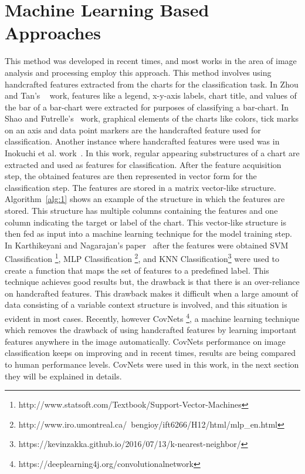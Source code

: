 \documentclass[12pt, a4paper,oneside]{report}
\begin{document}
\section{Machine Learning Based Approaches}
This method was developed in recent times, and most works in the area of image analysis and processing employ this approach. This method involves using handcrafted features extracted from the charts for the classification task. In Zhou and Tan's ~\cite{zhou2000bar} work, features like a legend, x-y-axis labels, chart title, and values of the bar of a bar-chart were extracted for purposes of classifying a bar-chart. In Shao and  Futrelle's~\cite{shao2005recognition} work, graphical elements of the charts like colors, tick marks on an axis and data point markers are the handcrafted feature used for classification. Another instance where handcrafted features were used was in Inokuchi et al. work~\cite{inokuchi2000apriori}. In this work, regular appearing substructures of a chart are extracted and used as features for classification. After the feature acquisition step, the obtained features are then represented in vector form for the classification step. The features are stored in a matrix vector-like structure. Algorithm~\ref{alg:1} shows an example of the structure in which the features are stored. This structure has multiple columns containing the features and one column indicating the target or label of the chart. This vector-like structure is then fed as input into a machine learning technique for the model training step. In Karthikeyani and Nagarajan's paper~\cite{karthikeyani2012machine} after the features were obtained SVM Classification \footnote{http://www.statsoft.com/Textbook/Support-Vector-Machines}, MLP Classification
\footnote{http://www.iro.umontreal.ca/~bengioy/ift6266/H12/html/mlp\_en.html}, and  KNN Classification\footnote{
https://kevinzakka.github.io/2016/07/13/k-nearest-neighbor/} were used to create a function that maps the set of features to a predefined label. This technique achieves good results but, the drawback is that there is an over-reliance on handcrafted features. This drawback makes it difficult when a large amount of data consisting of a variable context structure is involved, and this situation is evident in most cases. Recently, however CovNets \footnote{https://deeplearning4j.org/convolutionalnetwork}, a machine learning technique which removes the drawback of using handcrafted features by learning important features anywhere in the image automatically. CovNets performance on image classification keeps on improving and in recent times, results are being compared to human performance levels. CovNets were used in this work, in the next section they will be explained in details.
\end{document}
